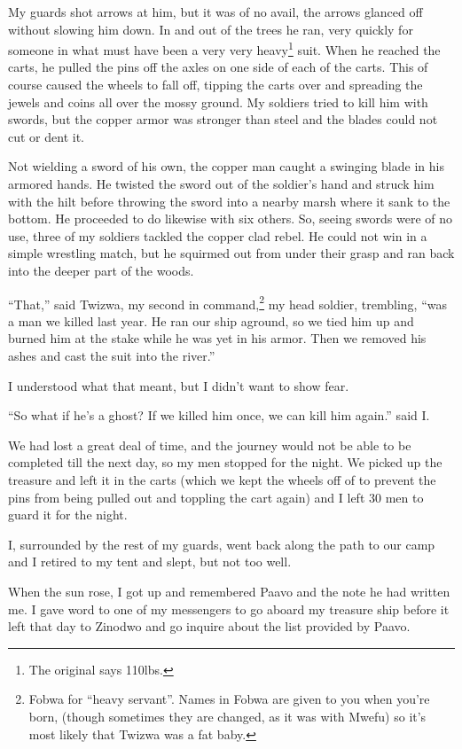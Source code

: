 My guards shot arrows at him, but it was of no avail, the arrows glanced off without slowing him down. In and out of the trees he ran, very quickly for someone in what must have been a very very heavy\footnote{The original says 110lbs.} suit. When he reached the carts, he pulled the pins off the axles on one side of each of the carts. This of course caused the wheels to fall off, tipping the carts over and spreading the jewels and coins all over the mossy ground. My soldiers tried to kill him with swords, but the copper armor was stronger than steel and the blades could not cut or dent it. 

Not wielding a sword of his own, the copper man caught a swinging blade in his armored hands. He twisted the sword out of the soldier's hand and struck him with the hilt before throwing the sword into a nearby marsh where it sank to the bottom. He proceeded to do likewise with six others. So, seeing swords were of no use, three of my soldiers tackled the copper clad rebel. He could not win in a simple wrestling match, but he squirmed out from under their grasp and ran back into the deeper part of the woods.

``That,'' said Twizwa, my second in command,\footnote{Fo\-bwa for ``heavy servant''. Names in Fo\-bwa are given to you when you're born, (though sometimes they are changed, as it was with Mwefu) so it's most likely that Twizwa was a fat baby.} my head soldier, trembling, ``was a man we killed last year. He ran our ship aground, so we tied him up and burned him at the stake while he was yet in his armor. Then we removed his ashes and cast the suit into the river.''

I understood what that meant, but I didn't want to show fear.

``So what if he's a ghost? If we killed him once, we can kill him again.'' said I.

We had lost a great deal of time, and the journey would not be able to be completed till the next day, so my men stopped for the night.
We picked up the treasure and left it in the carts (which we kept the wheels off of to prevent the pins from being pulled out and toppling the cart again) and I left 30 men to guard it for the night.

I, surrounded by the rest of my guards, went back along the path to our camp and I retired to my tent and slept, but not too well.

\tbreak

When the sun rose, I got up and remembered Paavo and the note he had written me. I gave word to one of my messengers to go aboard my treasure ship before it left that day to Zinodwo and go inquire about the list provided by Paavo. 

